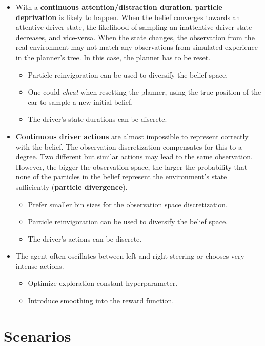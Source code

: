 \begin{itemize}
    \item With a \textbf{continuous attention/distraction duration}, \textbf{particle deprivation} is likely to happen. When the belief converges towards an attentive driver state, the likelihood of sampling an inattentive driver state decreases, and vice-versa. When the state changes, the observation from the real environment may not match any observations from simulated experience in the planner's tree. In this case, the planner has to be reset.
    \begin{itemize}
        \item Particle reinvigoration can be used to diversify the belief space.
        \item One could \textit{cheat} when resetting the planner, using the true position of the car to sample a new initial belief.
        \item The driver's state durations can be discrete.
    \end{itemize}
    \item \textbf{Continuous driver actions} are almost impossible to represent correctly with the belief. The observation discretization compensates for this to a degree. Two different but similar actions may lead to the same observation. However, the bigger the observation space, the larger the probability that none of the particles in the belief represent the environment's state sufficiently (\textbf{particle divergence}).
    \begin{itemize}
        \item Prefer smaller bin sizes for the observation space discretization.
        \item Particle reinvigoration can be used to diversify the belief space.
        \item The driver's actions can be discrete.
    \end{itemize}
    \item The agent often oscillates between left and right steering or chooses very intense actions.
    \begin{itemize}
        \item Optimize exploration constant hyperparameter.
        \item Introduce smoothing into the reward function.
    \end{itemize}
\end{itemize}

\section*{Scenarios}

